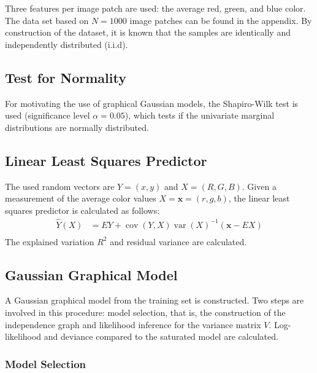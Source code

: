 \documentclass{article}
\DeclareMathOperator{\cov}{cov}
\DeclareMathOperator{\var}{var}
\begin{document}
Three features per image patch are used: the average red, green, and
blue color. The data set based on $N = 1000$ image patches can be
found in the appendix. By construction of the dataset, it is known
that the samples are identically and independently distributed
(i.i.d).

\subsection{Test for Normality}

For motivating the use of graphical Gaussian models, the Shapiro-Wilk
test is used (significance level $\alpha = 0.05$), which tests if the
univariate marginal distributions are normally distributed.

\subsection{Linear Least Squares Predictor}
\label{sec:llsp}


The used random vectors are $Y = (x, y)$ and $X = (R, G, B)$. Given a
measurement of the average color values $X = \textbf{x} = (r, g, b)$,
the linear least squares predictor is calculated as follows:
\begin{align*}
  \hat{Y}(X) & = EY + \cov(Y, X)\var(X)^{-1}(\textbf{x}-EX) \\
\end{align*}
The explained variation $R^2$ and residual variance are calculated.


\subsection{Gaussian Graphical Model}

A Gaussian graphical model from the training set is constructed. Two
steps are involved in this procedure: model selection, that is, the
construction of the independence graph and likelihood inference for
the variance matrix $V$.
Log-likelihood and deviance compared to the saturated model are
calculated.


\subsubsection{Model Selection}
\end{document}
